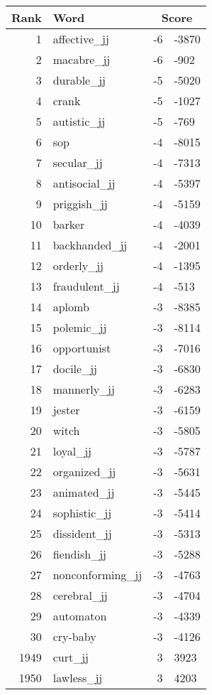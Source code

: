 \begin{longtable}[!htbp]{| rlr@{.}l |}
    \hline
    \textbf{Rank} & \textbf{Word} & \multicolumn{2}{c|}{\textbf{Score}} \\
    \hline
    \endhead
    1 & affective\_jj & -6 & -3870 \\
    2 & macabre\_jj & -6 & -902 \\
    3 & durable\_jj & -5 & -5020 \\
    4 & crank & -5 & -1027 \\
    5 & autistic\_jj & -5 & -769 \\
    6 & sop & -4 & -8015 \\
    7 & secular\_jj & -4 & -7313 \\
    8 & antisocial\_jj & -4 & -5397 \\
    9 & priggish\_jj & -4 & -5159 \\
    10 & barker & -4 & -4039 \\
    11 & backhanded\_jj & -4 & -2001 \\
    12 & orderly\_jj & -4 & -1395 \\
    13 & fraudulent\_jj & -4 & -513 \\
    14 & aplomb & -3 & -8385 \\
    15 & polemic\_jj & -3 & -8114 \\
    16 & opportunist & -3 & -7016 \\
    17 & docile\_jj & -3 & -6830 \\
    18 & mannerly\_jj & -3 & -6283 \\
    19 & jester & -3 & -6159 \\
    20 & witch & -3 & -5805 \\
    21 & loyal\_jj & -3 & -5787 \\
    22 & organized\_jj & -3 & -5631 \\
    23 & animated\_jj & -3 & -5445 \\
    24 & sophistic\_jj & -3 & -5414 \\
    25 & dissident\_jj & -3 & -5313 \\
    26 & fiendish\_jj & -3 & -5288 \\
    27 & nonconforming\_jj & -3 & -4763 \\
    28 & cerebral\_jj & -3 & -4704 \\
    29 & automaton & -3 & -4339 \\
    30 & cry-baby & -3 & -4126 \\
    1949 & curt\_jj & 3 & 3923 \\
    1950 & lawless\_jj & 3 & 4203 \\

\end{longtable}
